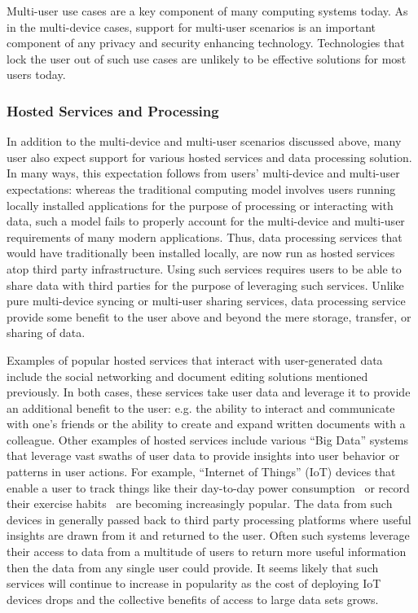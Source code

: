 Multi-user use cases are a key component of many computing systems
today. As in the multi-device cases, support for multi-user scenarios
is an important component of any privacy and security enhancing
technology. Technologies that lock the user out of such use cases are
unlikely to be effective solutions for most users today.

\subsubsection{Hosted Services and Processing}

In addition to the multi-device and multi-user scenarios discussed
above, many user also expect support for various hosted services and
data processing solution. In many ways, this expectation follows from
users' multi-device and multi-user expectations: whereas the
traditional computing model involves users running locally installed
applications for the purpose of processing or interacting with data,
such a model fails to properly account for the multi-device and
multi-user requirements of many modern applications. Thus, data
processing services that would have traditionally been installed
locally, are now run as hosted services atop third party
infrastructure. Using such services requires users to be able to share
data with third parties for the purpose of leveraging such
services. Unlike pure multi-device syncing or multi-user sharing
services, data processing service provide some benefit to the user
above and beyond the mere storage, transfer, or sharing of data.

Examples of popular hosted services that interact with user-generated
data include the social networking and document editing solutions
mentioned previously. In both cases, these services take user data and
leverage it to provide an additional benefit to the user: e.g. the
ability to interact and communicate with one's friends or the ability
to create and expand written documents with a colleague. Other
examples of hosted services include various ``Big Data'' systems that
leverage vast swaths of user data to provide insights into user
behavior or patterns in user actions. For example, ``Internet of
Things'' (IoT) devices that enable a user to track things like their
day-to-day power consumption~\cite{neurio} or record their exercise
habits~\cite{fitbit} are becoming increasingly popular. The data from
such devices in generally passed back to third party processing
platforms where useful insights are drawn from it and returned to the
user. Often such systems leverage their access to data from a
multitude of users to return more useful information then the data
from any single user could provide. It seems likely that such services
will continue to increase in popularity as the cost of deploying IoT
devices drops and the collective benefits of access to large data sets
grows.

